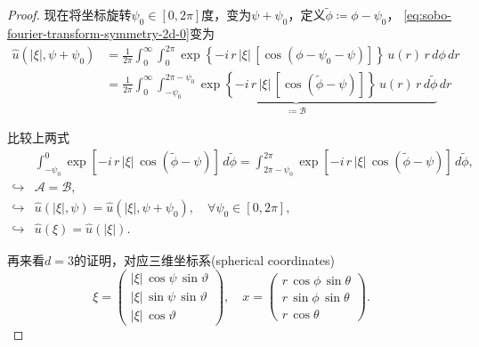 \begin{proof}
现在将坐标旋转$\psi_0 \in [0, 2 \pi]$度，变为$\psi + \psi_0$，定义$\widetilde{\phi} \coloneqq \phi - \psi_0$，  \eqref{eq:sobo-fourier-transform-symmetry-2d-0}变为
\begin{equation}
  \label{eq:sobo-fourier-transform-symmetry-2d-1}
  \begin{split}
    \widehat{u}\left(\left| \xi \right|, \psi + \psi_0 \right) &=
    \frac{1}{2\pi} \int_{0}^{\infty} \int_{0}^{2 \pi}
    \exp \left\{
    - i \, r \, \left| \xi \right| \,
    \left[
    \cos \left( \phi - \psi_0 - \psi \right)
    \right]
    \right\} \,
    u(r) \, r \, d \phi \, d r \\
    &= \frac{1}{2\pi} \int_{0}^{\infty} \underbrace{\int_{-\psi_0}^{2 \pi - \psi_0}
    \exp \left\{
    - i \, r \, \left| \xi \right| \,
    \left[
    \cos \left( \widetilde{\phi} - \psi \right)
    \right]
    \right\} \,
    u(r) \, r \, d \widetilde{\phi} }_{\coloneqq \mathcal{B}}\, d r
  \end{split}
\end{equation}

比较上两式
\begin{equation}
\label{eq:sobo-fourier-transform-symmetry-2d-2}
\begin{split}
  & \int_{-\psi_0}^{0} \exp
  \left[
  - i \, r \, \left| \xi \right| \, \cos \left( \widetilde{\phi} - \psi \right)
  \right] \, d \widetilde{\phi}
  = \int_{2 \pi - \psi_0}^{2 \pi} \exp
  \left[
  - i \, r \, \left| \xi \right| \, \cos \left( \widetilde{\phi} - \psi \right)
  \right] \, d \widetilde{\phi}, \\
  \hookrightarrow & \mathcal{A} = \mathcal{B},\\
  \hookrightarrow & \widehat{u}\left( \left| \xi \right|, \psi \right)
  = \widehat{u} \left( \left| \xi \right|, \psi+\psi_0 \right), \quad \forall \psi_0 \in [0, 2\pi], \\
  \hookrightarrow  & \widehat{u}(\xi) = \widehat{u} \left( \left| \xi \right| \right).
\end{split}
\end{equation}

再来看$d=3$的证明，对应三维坐标系(spherical coordinates)
\begin{equation*}
  \xi = \begin{pmatrix}
  \left| \xi \right| \, \cos \psi \, \sin \vartheta\\
  \left| \xi \right| \, \sin \psi \, \sin \vartheta\\
  \left| \xi \right| \, \cos \vartheta
  \end{pmatrix}, \quad
  x = \begin{pmatrix}
  r \, \cos \phi \, \sin \theta \\
  r \, \sin \phi \, \sin \theta \\
  r \, \cos \theta
  \end{pmatrix}.
\end{equation*}


\end{proof}
